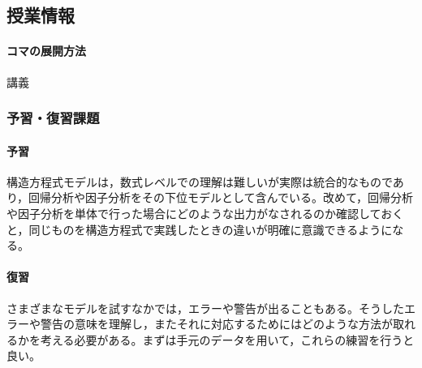 \subsection{授業情報}
\paragraph{コマの展開方法}
講義
\subsubsection{予習・復習課題}
\paragraph{予習} 構造方程式モデルは，数式レベルでの理解は難しいが実際は統合的なものであり，回帰分析や因子分析をその下位モデルとして含んでいる。改めて，回帰分析や因子分析を単体で行った場合にどのような出力がなされるのか確認しておくと，同じものを構造方程式で実践したときの違いが明確に意識できるようになる。
\paragraph{復習} さまざまなモデルを試すなかでは，エラーや警告が出ることもある。そうしたエラーや警告の意味を理解し，またそれに対応するためにはどのような方法が取れるかを考える必要がある。まずは手元のデータを用いて，これらの練習を行うと良い。